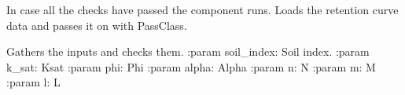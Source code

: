 \documentclass[letterpaper,10pt,english]{sphinxmanual}
\begin{document}
\begin{fulllineitems}
\begin{fulllineitems}
\end{fulllineitems}


\begin{fulllineitems}
\label{\detokenize{cmf:livestock.components.comp_cmf.CMFRetentionCurve.run}}
In case all the checks have passed the component runs.
Loads the retention curve data and passes it on with PassClass.

\end{fulllineitems}


\begin{fulllineitems}
\label{\detokenize{cmf:livestock.components.comp_cmf.CMFRetentionCurve.run_checks}}
Gathers the inputs and checks them.
:param soil\_index: Soil index.
:param k\_sat: Ksat
:param phi: Phi
:param alpha: Alpha
:param n: N
:param m: M
:param l: L

\end{fulllineitems}


\end{fulllineitems}

\end{document}
